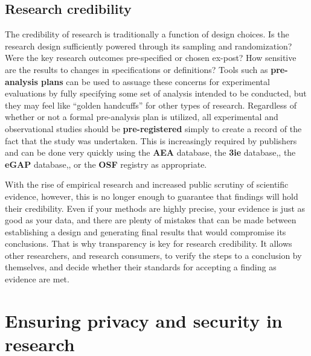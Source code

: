 \subsection{Research credibility}

The credibility of research is traditionally a function of design choices.\cite{angrist2010credibility,ioannidis2005most}
Is the research design sufficiently powered through its sampling and randomization?
Were the key research outcomes pre-specified or chosen ex-post?
How sensitive are the results to changes in specifications or definitions?
Tools such as \textbf{pre-analysis plans}
can be used to assuage these concerns for experimental evaluations
by fully specifying some set of analysis intended to be conducted,
but they may feel like ``golden handcuffs'' for other types of research.\cite{olken2015promises}
Regardless of whether or not a formal pre-analysis plan is utilized,
all experimental and observational studies should be \textbf{pre-registered}
simply to create a record of the fact that the study was undertaken.
This is increasingly required by publishers and can be done very quickly
using the \textbf{AEA} database,
the \textbf{3ie} database,,
the \textbf{eGAP} database,,
or the \textbf{OSF} registry as appropriate.

With the rise of empirical research and increased public scrutiny of scientific evidence, however,
this is no longer enough to guarantee that findings will hold their credibility.
Even if your methods are highly precise,
your evidence is just as good as your data,
and there are plenty of mistakes that can be made between establishing a design and generating final results that would compromise its conclusions.
That is why transparency is key for research credibility.
It allows other researchers, and research consumers,
to verify the steps to a conclusion by themselves,
and decide whether their standards for accepting a finding as evidence are met.



\section{Ensuring privacy and security in research}

